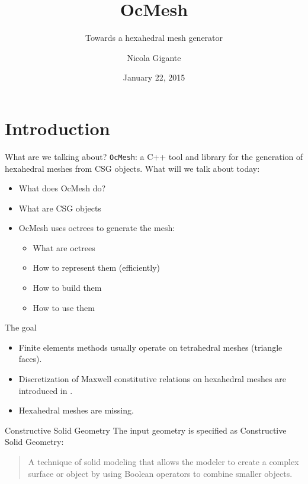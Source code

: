 \documentclass[utf8x]{beamer}
\title{OcMesh}
\subtitle{Towards a hexahedral mesh generator}
\author{Nicola Gigante}
\date{January 22, 2015}
\begin{document}
\begin{frame}
\maketitle
\end{frame}

\section{Introduction}
\begin{frame}[fragile]{What are we talking about?}
\verb|OcMesh|: a C++ tool and library for the generation of hexahedral meshes
from CSG objects.
\vfill
What will we talk about today:
\begin{itemize}
\item What does OcMesh do?
\item What are CSG objects
\item OcMesh uses octrees to generate the mesh:
      \begin{itemize}
      \item What are octrees
      \item How to represent them (efficiently)
      \item How to build them
      \item How to use them
      \end{itemize}
\end{itemize}
\end{frame}

\begin{frame}{The goal}
\begin{itemize}
\item Finite elements methods usually operate on tetrahedral meshes 
      (triangle faces).
\item Discretization of Maxwell constitutive relations on hexahedral meshes 
      are introduced in \cite{Specogna2010}.
\item Hexahedral meshes are missing.
\end{itemize}
\end{frame}

\begin{frame}{Constructive Solid Geometry}
The input geometry is specified as Constructive Solid Geometry:
\begin{quote}
A technique of solid modeling that allows the modeler to create a complex 
surface or object by using Boolean operators to combine smaller objects.
\end{quote}
\end{frame}
\end{document}

